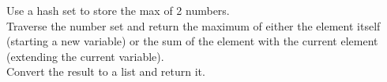 \documentclass[preview]{standalone}
\begin{document}
Use a hash set to store the max of 2 numbers.\\Traverse the number set and return the maximum of either the element itself (starting a new variable) or the sum of the element with the current element (extending the current variable).\\Convert the result to a list and return it.\\
\end{document}
